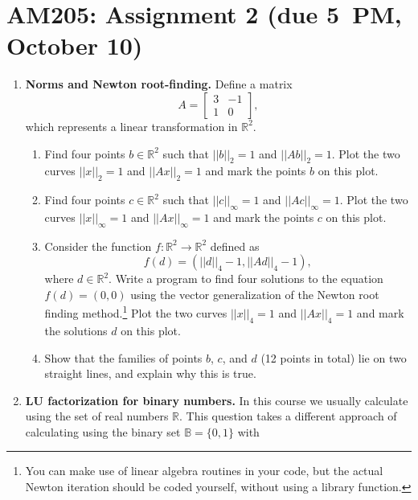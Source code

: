 \documentclass[11pt]{article}
\newcommand{\R}{\mathbb{R}}
\newcommand{\B}{\mathbb{B}}
\begin{document}
\section*{AM205: Assignment 2 (due 5~PM, October 10)}

\begin{enumerate}
  \item {\bf Norms and Newton root-finding.} Define a matrix
    \begin{equation}
      A=\left[
      \begin{array}{cc}
	3 & -1 \\
	1 & 0
      \end{array}
      \right],
    \end{equation}
    which represents a linear transformation in $\R^2$.
    \begin{enumerate}
      \item Find four points $b \in \R^2$ such that $||b||_2 = 1$ and
	$||Ab||_2=1$. Plot the two curves $||x||_2=1$ and $||Ax||_2=1$ and mark
	the points $b$ on this plot.
      \item Find four points $c \in \R^2$ such that $||c||_\infty = 1$ and
	$||Ac||_\infty=1$. Plot the two curves $||x||_\infty=1$ and
	$||Ax||_\infty=1$ and mark the points $c$ on this plot.
      \item Consider the function $f:\R^2 \to \R^2$ defined as 
	\begin{equation}
	  f(d)=( ||d||_4-1, ||Ad||_4-1),
	\end{equation}
	where $d\in \R^2$. Write a program to find four solutions to the
	equation $f(d)=(0,0)$ using the vector generalization of the Newton
	root finding method.\footnote{You can make use of linear algebra
	routines in your code, but the actual Newton iteration should be coded
	yourself, without using a library function.} Plot the two curves
	$||x||_4=1$ and $||Ax||_4=1$ and mark the solutions $d$ on this plot.
      \item Show that the families of points $b$, $c$, and $d$ (12 points in
	total) lie on two straight lines, and explain why this is true.
    \end{enumerate}
  \item {\bf LU factorization for binary numbers.} In this course we usually
    calculate using the set of real numbers $\R$. This question takes
    a different approach of calculating using the binary set $\B=\{0,1\}$ with

\end{enumerate}
\end{document}

